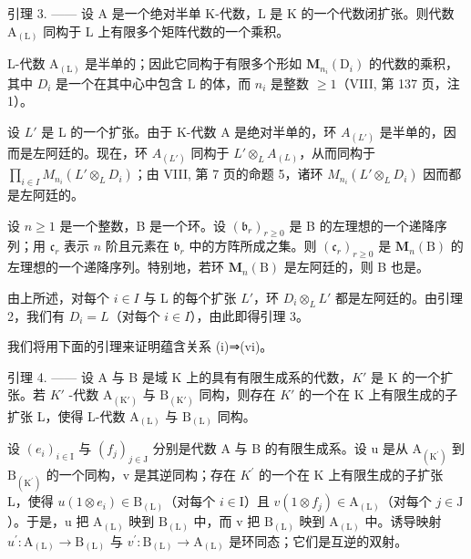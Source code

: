 引理 3. —— 设 A 是一个绝对半单 K-代数，L 是 K 的一个代数闭扩张。则代数 \(\mathrm{A}_{(\mathrm{L})}\) 同构于 L 上有限多个矩阵代数的一个乘积。

L-代数 \(\mathrm{A}_{(\mathrm{L})}\) 是半单的；因此它同构于有限多个形如 \(\mathbf{M}_{n_{i}}(\mathrm{D}_{i})\) 的代数的乘积，其中 \(D_{i}\) 是一个在其中心中包含 L 的体，而 \(n_{i}\) 是整数 \(\geqslant 1\)（VIII, 第 137 页，注 1）。

设 \(L'\) 是 L 的一个扩张。由于 K-代数 A 是绝对半单的，环 \(A_{(L')}\) 是半单的，因而是左阿廷的。现在，环 \(A_{(L')}\) 同构于 \(L' \otimes_L A_{(L)}\)，从而同构于 \(\prod_{i \in I} M_{n_i}(L' \otimes_L D_i)\)；由 VIII, 第 7 页的命题 5，诸环 \(M_{n_i}(L' \otimes_L D_i)\) 因而都是左阿廷的。

设 \(n \geqslant 1\) 是一个整数，B 是一个环。设 \((\mathfrak{b}_r)_{r \geqslant 0}\) 是 B 的左理想的一个递降序列；用 \(\mathfrak{c}_r\) 表示 \(n\) 阶且元素在 \(\mathfrak{b}_r\) 中的方阵所成之集。则 \((\mathfrak{c}_r)_{r \geqslant 0}\) 是 \(\mathbf{M}_n(\mathrm{B})\) 的左理想的一个递降序列。特别地，若环 \(\mathbf{M}_n(\mathrm{B})\) 是左阿廷的，则 B 也是。

由上所述，对每个 \(i \in I\) 与 L 的每个扩张 \(L'\)，环 \(D_{i} \otimes_{L} L'\) 都是左阿廷的。由引理 2，我们有 \(D_{i} = L\)（对每个 \(i \in I\)），由此即得引理 3。

我们将用下面的引理来证明蕴含关系 (i)⇒(vi)。

引理 4. —— 设 A 与 B 是域 K 上的具有有限生成系的代数，\(K'\) 是 K 的一个扩张。若 \(K'\) -代数 \(\mathrm{A}_{(\mathrm{K}')}\) 与 \(\mathrm{B}_{(\mathrm{K}')}\) 同构，则存在 \(K'\) 的一个在 K 上有限生成的子扩张 L，使得 L-代数 \(\mathrm{A}_{(\mathrm{L})}\) 与 \(\mathrm{B}_{(\mathrm{L})}\) 同构。

设 \((e_{i})_{i\in\mathrm{I}}\) 与 \((f_{j})_{j\in\mathrm{J}}\) 分别是代数 A 与 B 的有限生成系。设 u 是从 \(\mathrm{A}_{(\mathrm{K}^{\prime})}\) 到 \(\mathrm{B}_{(\mathrm{K}^{\prime})}\) 的一个同构，v 是其逆同构；存在 \(K^{\prime}\) 的一个在 K 上有限生成的子扩张 L，使得 \(u(1\otimes e_{i})\in\mathrm{B}_{(\mathrm{L})}\)（对每个 \(i\in\mathrm{I}\)）且 \(v(1\otimes f_{j})\in\mathrm{A}_{(\mathrm{L})}\)（对每个 \(j\in\mathrm{J}\)）。于是，u 把 \(\mathrm{A}_{(\mathrm{L})}\) 映到 \(\mathrm{B}_{(\mathrm{L})}\) 中，而 v 把 \(\mathrm{B}_{(\mathrm{L})}\) 映到 \(\mathrm{A}_{(\mathrm{L})}\) 中。诱导映射 \(u^{\prime}:\mathrm{A}_{(\mathrm{L})}\to\mathrm{B}_{(\mathrm{L})}\) 与 \(v^{\prime}:\mathrm{B}_{(\mathrm{L})}\to\mathrm{A}_{(\mathrm{L})}\) 是环同态；它们是互逆的双射。

